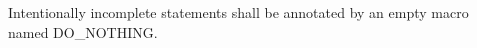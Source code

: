 \subsection*{\myRule{}}

Intentionally incomplete statements shall be annotated by an empty macro named DO\_NOTHING.
